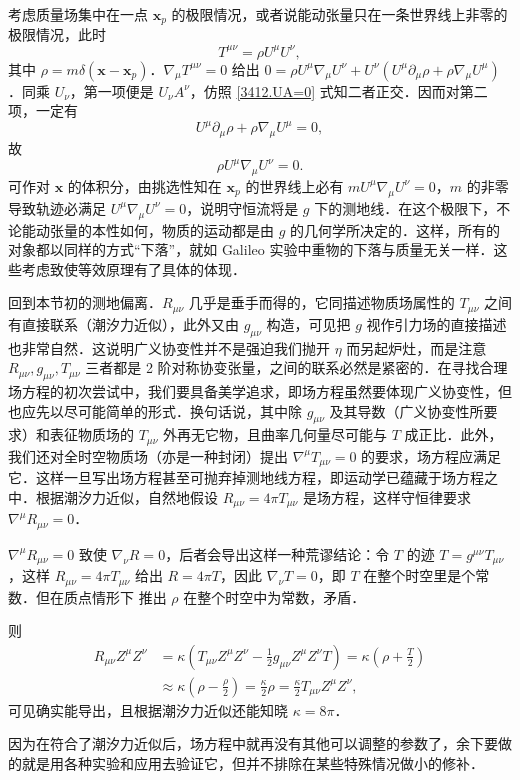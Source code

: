 考虑质量场集中在一点 $\bm x_p$ 的极限情况，或者说能动张量只在一条世界线上非零的极限情况，此时
\[
T^{\mu\nu}=\rho U^\mu U^\nu,
\]
其中 $\rho=m\delta(\bm x-\bm x_p)$．$\nabla_\mu T^{\mu\nu}=0$ 给出 $0=\rho U^\mu \nabla_\mu U^\nu+ U^\nu (U^\mu\partial_\mu\rho+\rho\nabla_\mu U^\mu)$．同乘 $U_\nu$，第一项便是 $U_\nu A^\nu$，仿照 \eqref{3412.UA=0} 式知二者正交．因而对第二项，一定有
\[
U^\mu\partial_\mu\rho+\rho\nabla_\mu U^\mu=0,
\]
故
\[
\rho U^\mu \nabla_\mu U^\nu=0.
\]
可作对 $\bm x$ 的体积分，由挑选性知在 $\bm x_p$ 的世界线上必有 $m U^\mu \nabla_\mu U^\nu=0$，$m$ 的非零导致轨迹必满足 $U^\mu \nabla_\mu U^\nu=0$，说明守恒流将是 $g$ 下的测地线．在这个极限下，不论能动张量的本性如何，物质的运动都是由 $g$ 的几何学所决定的．这样，所有的对象都以同样的方式“下落”，就如 Galileo 实验中重物的下落与质量无关一样．这些考虑致使等效原理有了具体的体现．

回到本节初的测地偏离．$R_{\mu\nu}$ 几乎是垂手而得的，它同描述物质场属性的 $T_{\mu\nu}$ 之间有直接联系（潮汐力近似），此外又由 $g_{\mu\nu}$ 构造，可见把 $g$ 视作引力场的直接描述也非常自然．这说明广义协变性并不是强迫我们抛开 $\eta$ 而另起炉灶，而是注意 $R_{\mu\nu},g_{\mu\nu},T_{\mu\nu}$ 三者都是 2 阶对称协变张量，之间的联系必然是紧密的．在寻找合理场方程的初次尝试中，我们要具备美学追求，即场方程虽然要体现广义协变性，但也应先以尽可能简单的形式．换句话说，其中除 $g_{\mu\nu}$ 及其导数（广义协变性所要求）和表征物质场的 $T_{\mu\nu}$ 外再无它物，且曲率几何量尽可能与 $T$ 成正比．此外，我们还对全时空物质场（亦是一种封闭）提出 $\nabla^\mu T_{\mu\nu}=0$ 的要求，场方程应满足它．这样一旦写出场方程甚至可抛弃掉测地线方程，即运动学已蕴藏于场方程之中．根据潮汐力近似，自然地假设 $R_{\mu\nu}=4\pi  T_{\mu\nu}$ 是场方程，这样守恒律要求 $\nabla^\mu R_{\mu\nu}=0$．


$\nabla^\mu R_{\mu\nu}=0$ 致使 $\nabla_\nu R=0$，后者会导出这样一种荒谬结论：令 $T$ 的迹 $T=g^{\mu\nu}T_{\mu\nu}$，这样 $R_{\mu\nu}=4\pi  T_{\mu\nu}$ 给出 $R=4\pi  T$，因此 $\nabla_\nu T=0$，即 $T$ 在整个时空里是个常数．但在质点情形下
推出 $\rho$ 在整个时空中为常数，矛盾．

则
\begin{align*}
    R_{\mu\nu}Z^\mu Z^\nu&=\kappa\left(T_{\mu\nu}Z^\mu Z^\nu-\frac12 g_{\mu\nu}Z^\mu Z^\nu T\right)=\kappa\left(\rho+\frac T2\right)\\
    &\approx \kappa\left(\rho-\frac\rho 2\right)=\frac\kappa 2\rho=\frac\kappa 2 T_{\mu\nu}Z^\mu Z^\nu,
\end{align*}
可见确实能导出，且根据潮汐力近似还能知晓 $\kappa=8\pi$．


因为在符合了潮汐力近似后，场方程中就再没有其他可以调整的参数了，余下要做的就是用各种实验和应用去验证它，但并不排除在某些特殊情况做小的修补．